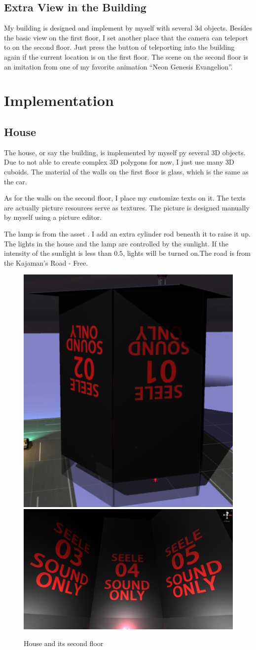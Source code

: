 \documentclass[11pt]{article}
\begin{document}
	\subsection{Extra View in the Building}
	My building is designed and implement by myself with several 3d objects. Besides the basic view on the first floor, I set another place that the camera can teleport to on the second floor. Just press the button of teleporting into the building again if the current location is on the first floor. The scene on the second floor is an imitation from one of my favorite animation ``Neon Genesis Evangelion''.
	
	\section{Implementation}
	\subsection{House}
	The house, or say the building, is implemented by myself py several 3D objects. Due to not able to create complex 3D polygons for now, I just use many 3D cuboids. The material of the walls on the first floor is glass, which is the same as the car\cite{carassets}.
	
	As for the walls on the second floor, I place my customize texts on it. The texts are actually picture resources serve as textures. The picture is designed manually by myself using a picture editor.
	
	The lamp is from the asset \cite{japanlampassets}. I add an extra cylinder rod beneath it to raise it up.
	The lights in the house and the lamp are controlled by the sunlight. If the intensity of the sunlight is less than $0.5$, lights will be turned on.The road is from the Kajaman's Road - Free\cite{kajamansroadsassets}.
	
	\begin{figure}[htbp]
		\centering
		\includegraphics[width=.45\textwidth]{fig/building.png}
		\includegraphics[width=.45\textwidth]{fig/coloregg.png}
		\caption{House and its second floor}
	\end{figure}
	
\end{document}
